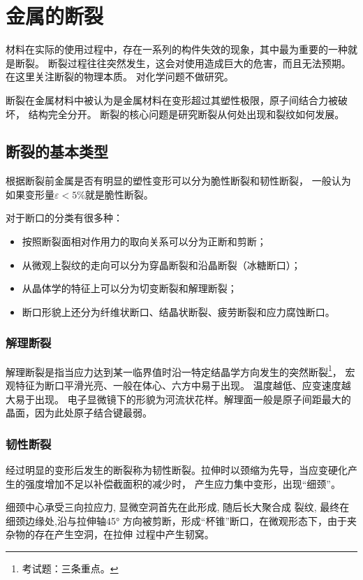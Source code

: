 \chapter{金属的断裂}
    材料在实际的使用过程中，存在一系列的构件失效的现象，其中最为重要的一种就是断裂。
    断裂过程往往突然发生，这会对使用造成巨大的危害，而且无法预期。在这里关注断裂的物理本质。
    对化学问题不做研究。

    断裂在金属材料中被认为是金属材料在变形超过其塑性极限，原子间结合力被破坏，
    结构完全分开。
    断裂的核心问题是研究断裂从何处出现和裂纹如何发展。
    \section{断裂的基本类型}
        根据断裂前金属是否有明显的塑性变形可以分为脆性断裂和韧性断裂，
        一般认为如果变形量$\varepsilon<5\%$就是脆性断裂。

        对于断口的分类有很多种：
        \begin{itemize}
            \item 按照断裂面相对作用力的取向关系可以分为正断和剪断；
            \item 从微观上裂纹的走向可以分为穿晶断裂和沿晶断裂（冰糖断口）；
            \item 从晶体学的特征上可以分为切变断裂和解理断裂；
            \item 断口形貌上还分为纤维状断口、结晶状断裂、疲劳断裂和应力腐蚀断口。
        \end{itemize}

        \subsection{解理断裂}
            解理断裂是指当应力达到某一临界值时沿一特定结晶学方向发生的突然断裂\footnote{考试题：三条重点。}，
            宏观特征为断口平滑光亮、一般在体心、六方中易于出现。 温度越低、应变速度越大易于出现。
            电子显微镜下的形貌为河流状花样。解理面一般是原子间距最大的晶面，因为此处原子结合键最弱。

        \subsection{韧性断裂}
            经过明显的变形后发生的断裂称为韧性断裂。拉伸时以颈缩为先导，当应变硬化产生的强度增加不足以补偿截面积的减少时，
            产生应力集中变形，出现“细颈”。

            细颈中心承受三向拉应力, 显微空洞首先在此形成, 随后长大聚合成 裂纹, 最终在细颈边缘处,沿与拉伸轴\ang{45}
            方向被剪断，形成“杯锥”断口，在微观形态下，由于夹杂物的存在产生空洞，在拉伸
            过程中产生韧窝。

